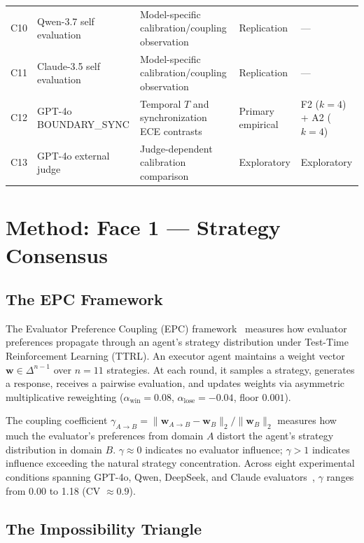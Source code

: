 \documentclass[11pt]{article}
\begin{document}
\begin{table}[t]
\begin{tabularx}{\textwidth}{@{}l p{} X p{} p{}@{}}
C10 & Qwen-3.7 self evaluation & Model-specific calibration/coupling observation & Replication & --- \\
C11 & Claude-3.5 self evaluation & Model-specific calibration/coupling observation & Replication & --- \\
C12 & GPT-4o BOUNDARY\_SYNC & Temporal $T$ and synchronization ECE contrasts & Primary empirical & F2 ($k{=}4$) + A2 ($k{=}4$) \\
C13 & GPT-4o external judge & Judge-dependent calibration comparison & Exploratory & Exploratory \\
\bottomrule
\end{tabularx}
\end{table}

\section{Method: Face 1 --- Strategy Consensus}

\subsection{The EPC Framework}

The Evaluator Preference Coupling (EPC) framework~\cite{liu2026epc} measures how evaluator preferences propagate through an agent's strategy distribution under Test-Time Reinforcement Learning (TTRL). An executor agent maintains a weight vector $\mathbf{w} \in \Delta^{n-1}$ over $n = 11$ strategies. At each round, it samples a strategy, generates a response, receives a pairwise evaluation, and updates weights via asymmetric multiplicative reweighting ($\alpha_{\text{win}} = 0.08$, $\alpha_{\text{lose}} = -0.04$, floor $0.001$).

The coupling coefficient $\gamma_{A \to B} = \|\mathbf{w}_{A \to B} - \mathbf{w}_B\|_2 / \|\mathbf{w}_B\|_2$ measures how much the evaluator's preferences from domain $A$ distort the agent's strategy distribution in domain $B$. $\gamma \approx 0$ indicates no evaluator influence; $\gamma > 1$ indicates influence exceeding the natural strategy concentration. Across eight experimental conditions spanning GPT-4o, Qwen, DeepSeek, and Claude evaluators~\cite{liu2026epc}, $\gamma$ ranges from 0.00 to 1.18 (CV $\approx 0.9$).

\subsection{The Impossibility Triangle}
\end{document}
